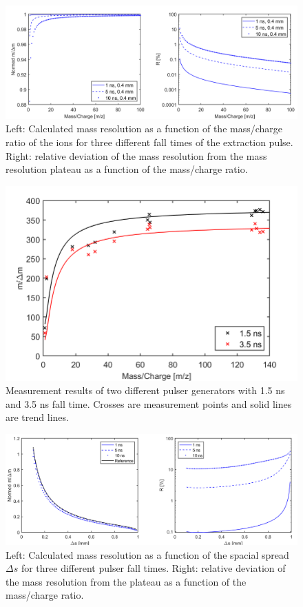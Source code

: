 	\begin{figure}[h] %
		\centering
		\includegraphics[width=\textwidth]{Bilder/PulseSimMassRes_Norm.png}
		\caption{Left: Calculated mass resolution as a function of the mass/charge ratio of the ions for three different fall times of the extraction pulse. Right: relative deviation of the mass resolution from the mass resolution plateau as a function of the mass/charge ratio.}
		\label{fig:Simtfall}
	\end{figure}
	\begin{figure}[h!] %
		\centering
		\includegraphics[width=.8\textwidth]{Bilder/PulseLabWLEm480.png}
		\caption{Measurement results of two different pulser generators with 1.5 ns and 3.5 ns fall time. Crosses are measurement points and solid lines are trend lines.}
		\label{fig:LabWLE}
	\end{figure}
	\begin{figure}[h!] %
		\centering
		\includegraphics[width=\textwidth]{Bilder/PulseSimPosition.png}
		\caption{Left: Calculated mass resolution as a function of the spacial spread $\Delta s$ for three different pulser fall times. Right: relative deviation of the mass resolution from the plateau as a function of the mass/charge ratio.}
		\label{fig:SimtfallPos}
	\end{figure}
